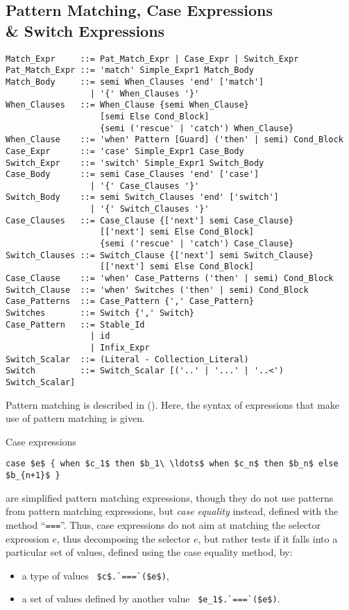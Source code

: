 \subsection[Pattern Matching, Case Expressions \& Switch Expressions]{Pattern Matching, Case Expressions \\\& Switch Expressions}
\label{sec:case-exprs}


\syntax\begin{lstlisting}
Match_Expr     ::= Pat_Match_Expr | Case_Expr | Switch_Expr
Pat_Match_Expr ::= 'match' Simple_Expr1 Match_Body
Match_Body     ::= semi When_Clauses 'end' ['match']
                 | '{' When_Clauses '}'
When_Clauses   ::= When_Clause {semi When_Clause} 
                   [semi Else Cond_Block]
                   {semi ('rescue' | 'catch') When_Clause}
When_Clause    ::= 'when' Pattern [Guard] ('then' | semi) Cond_Block
Case_Expr      ::= 'case' Simple_Expr1 Case_Body
Switch_Expr    ::= 'switch' Simple_Expr1 Switch_Body
Case_Body      ::= semi Case_Clauses 'end' ['case']
                 | '{' Case_Clauses '}'
Switch_Body    ::= semi Switch_Clauses 'end' ['switch']
                 | '{' Switch_Clauses '}'
Case_Clauses   ::= Case_Clause {['next'] semi Case_Clause}
                   [['next'] semi Else Cond_Block]
                   {semi ('rescue' | 'catch') Case_Clause}
Switch_Clauses ::= Switch_Clause {['next'] semi Switch_Clause}
                   [['next'] semi Else Cond_Block]
Case_Clause    ::= 'when' Case_Patterns ('then' | semi) Cond_Block
Switch_Clause  ::= 'when' Switches ('then' | semi) Cond_Block
Case_Patterns  ::= Case_Pattern {',' Case_Pattern}
Switches       ::= Switch {',' Switch}
Case_Pattern   ::= Stable_Id
                 | id
                 | Infix_Expr
Switch_Scalar  ::= (Literal - Collection_Literal)
Switch         ::= Switch_Scalar [('..' | '...' | '..<') Switch_Scalar]
\end{lstlisting}

Pattern matching is described in (). Here, the syntax of expressions that make use of pattern matching is given. 

Case expressions 
\begin{lstlisting}
case $e$ { when $c_1$ then $b_1\ \ldots$ when $c_n$ then $b_n$ else $b_{n+1}$ }
\end{lstlisting}
are simplified pattern matching expressions, though they do not use patterns from pattern matching expressions, but {\em case equality} instead, defined with the method ``\lstinline!===!''. Thus, case expressions do not aim at matching the selector expression $e$, thus decomposing the selector $e$, but rather tests if it falls into a particular set of values, defined using the case equality method, by:
\begin{itemize}
  \item a type of values ~\lstinline!$c$.`===`($e$)!,
  \item a set of values defined by another value ~\lstinline!$e_1$.`===`($e$)!.
\end{itemize}

